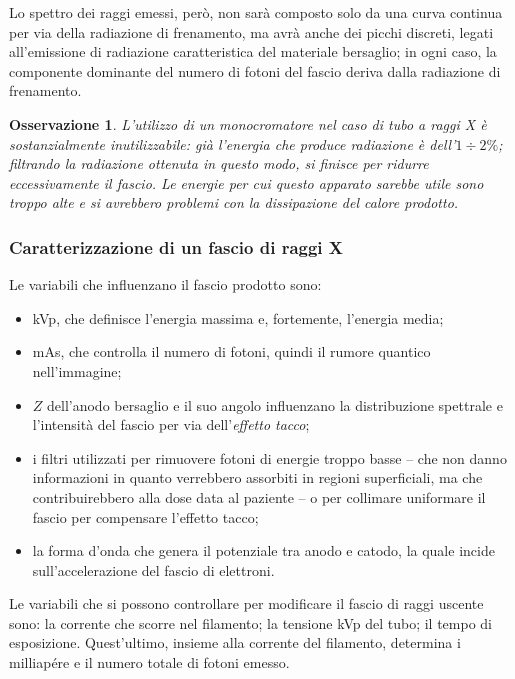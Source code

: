 \documentclass[11pt, a4paper]{scrartcl}
\theoremstyle{style}
\newtheorem{osservazione}{Osservazione}[section]
\theoremstyle{style1}
\numberwithin{equation}{subsection}
\begin{document}
Lo spettro dei raggi emessi, per\`o, non sar\`a composto solo da una curva continua per via della radiazione di frenamento, ma avr\`a anche dei picchi discreti, legati all'emissione di radiazione caratteristica del materiale bersaglio; in ogni caso, la componente dominante del numero di fotoni del fascio deriva dalla radiazione di frenamento.
\begin{osservazione}
L'utilizzo di un monocromatore nel caso di tubo a raggi X \`e sostanzialmente inutilizzabile: gi\`a l'energia che produce radiazione \`e dell'$1\div 2\%$; filtrando la radiazione ottenuta in questo modo, si finisce per ridurre eccessivamente il fascio.
Le energie per cui questo apparato sarebbe utile sono troppo alte e si avrebbero problemi con la dissipazione del calore prodotto.
\end{osservazione}

\subsubsection{Caratterizzazione di un fascio di raggi X}

Le variabili che influenzano il fascio prodotto sono:
\begin{itemize}
	\item kVp, che definisce l'energia massima e, fortemente, l'energia media;
	\item mAs, che controlla il numero di fotoni, quindi il rumore quantico nell'immagine;
	\item $Z$ dell'anodo bersaglio e il suo angolo influenzano la distribuzione spettrale e l'intensit\`a del fascio per via dell'\textit{effetto tacco};
	\item i filtri utilizzati per rimuovere fotoni di energie troppo basse -- che non danno informazioni in quanto verrebbero assorbiti in regioni superficiali, ma che contribuirebbero alla dose data al paziente -- o per collimare uniformare il fascio per compensare l'effetto tacco;
	\item la forma d'onda che genera il potenziale tra anodo e catodo, la quale incide sull'accelerazione del fascio di elettroni.
\end{itemize}
Le variabili che si possono controllare per modificare il fascio di raggi uscente sono: la corrente che scorre nel filamento; la tensione kVp del tubo; il tempo di esposizione.
Quest'ultimo, insieme alla corrente del filamento, determina i milliap\'ere e il numero totale di fotoni emesso.
\end{document}
